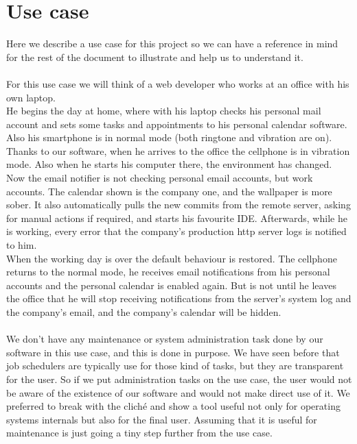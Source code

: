 \section{Use case}
\label{usecase}
Here we describe a use case for this project so we can have a reference in mind for the rest of the document to illustrate
and help us to understand it.\\
\\
For this use case we will think of a web developer who works at an office with his own laptop.\\
He begins the day at home, where with his laptop checks his personal mail account and sets some tasks and appointments to his personal 
calendar software. Also his smartphone is in 
normal mode (both ringtone and vibration are on).\\ %
Thanks to our software, when he arrives to the office the cellphone is in vibration mode. Also when he starts his computer there, the
environment has changed. Now the email notifier is not checking personal email accounts, but work accounts. The calendar shown is the
company one, and the wallpaper is more sober. It also automatically pulls the new commits from the remote server, asking for manual actions
if required, and starts his favourite IDE. Afterwards, while he is working, every error that the company's production http server logs is 
notified to him.\\
When the working day is over the default behaviour is restored. The cellphone returns to the normal mode, he receives email notifications
from his personal accounts and the personal calendar is enabled again. But is not until he leaves the office that he will stop receiving 
notifications from the server's system log and the company's email, and the company's calendar will be hidden.\\
\\
We don't have any maintenance or system administration task done by our software in this use case, and this is done in purpose. We have 
seen before that job schedulers are typically use for those kind of tasks, but they are transparent for the user. So if we put 
administration tasks on the use case, the user would not be aware of the existence of our software and would not make direct use of it.
We preferred to break with the cliché and show a tool useful not only for operating systems internals but also for the final user. Assuming
that it is useful for maintenance is just going a tiny step further from the use case.
